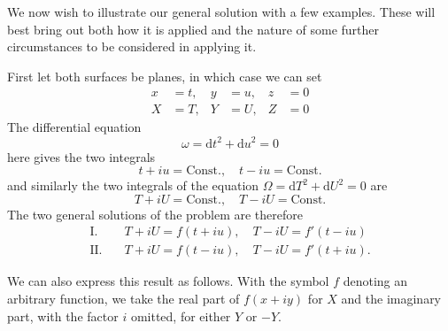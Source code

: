 We now wish to illustrate our general solution with a few examples. These will best bring out both how it is applied and the nature of some further circumstances to be considered in applying it.

First let both surfaces be planes, in which case we can set
\[
\begin{aligned}
x&=t,&y&=u,&z&=0\\
X&=T,&Y&=U,&Z&=0
\end{aligned}
\]
\noindent The differential equation
\[
\omega=\mathrm{d}t^2+\mathrm{d}u^2=0
\]
\noindent here gives the two integrals
\[
t+iu=\text{Const.},\quad t-iu=\text{Const.}
\]
\noindent and similarly the two integrals of the equation \(\Omega=\mathrm{d}T^2+\mathrm{d}U^2=0\) are
\[
T+iU=\text{Const.},\quad T-iU=\text{Const.}
\]
\noindent The two general solutions of the problem are therefore
\[
\begin{aligned}
\mathrm{I.}\quad&T+iU=f(t+iu),\quad T-iU=f'(t-iu)\\
\mathrm{II.}\quad&T+iU=f(t-iu),\quad T-iU=f'(t+iu).
\end{aligned}
\]
\par\indent{}%
We can also express this result as follows. With the symbol \(f\) denoting an arbitrary function, we take the real part of \(f(x+iy)\) for \(X\) and the imaginary part, with the factor \(i\) omitted, for either \(Y\) or \(-Y\).

